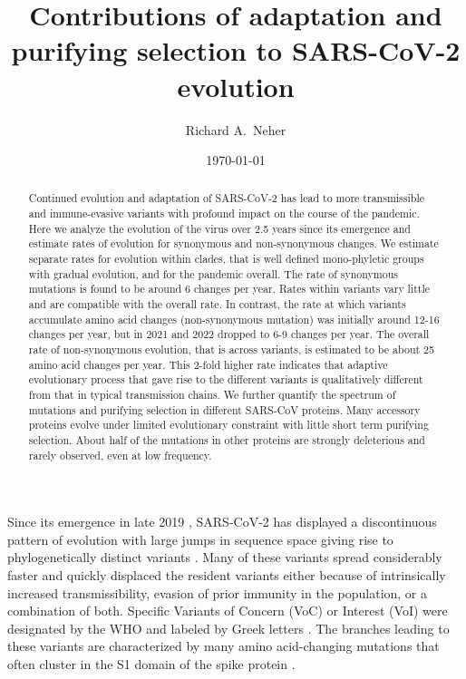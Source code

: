 \documentclass[aps,rmp, twocolumn]{revtex4}
\begin{document}
\title{Contributions of adaptation and purifying selection to SARS-CoV-2 evolution}
\author{Richard A.~Neher}
\address{Biozentrum, University of Basel, Basel, Switzerland }
\address{Swiss Institute of Bioinformatics, Switzerland }

\date{\today}

\begin{abstract}
Continued evolution and adaptation of SARS-CoV-2 has lead to more transmissible and immune-evasive variants with profound impact on the course of the pandemic.
Here we analyze the evolution of the virus over 2.5 years since its emergence and estimate rates of evolution for synonymous and non-synonymous changes.
We estimate separate rates for evolution within clades, that is well defined mono-phyletic groups with gradual evolution, and for the pandemic overall.
The rate of synonymous mutations is found to be around 6 changes per year.
Rates within variants vary little and are compatible with the overall rate.
In contrast, the rate at which variants accumulate amino acid changes (non-synonymous mutation) was initially around 12-16 changes per year, but in 2021 and 2022 dropped to 6-9 changes per year.
The overall rate of non-synonymous evolution, that is across variants, is estimated to be about 25 amino acid changes per year.
This 2-fold higher rate indicates that adaptive evolutionary process that gave rise to the different variants is qualitatively different from that in typical transmission chains.
We further quantify the spectrum of mutations and purifying selection in different SARS-CoV proteins.
Many accessory proteins evolve under limited evolutionary constraint with little short term purifying selection.
About half of the mutations in other proteins are strongly deleterious and rarely observed, even at low frequency.
\end{abstract}

\maketitle

Since its emergence in late 2019 \citep{zhu_novel_2020}, SARS-CoV-2 has displayed a discontinuous pattern of evolution with large jumps in sequence space giving rise to phylogenetically distinct variants \citep{hodcroft_spread_2021,volz_assessing_2021,tegally_detection_2021,faria_genomics_2021,naveca_covid-19_2021,viana_rapid_2022}.
Many of these variants spread considerably faster and quickly displaced the resident variants either because of intrinsically increased transmissibility, evasion of prior immunity in the population, or a combination of both.
Specific Variants of Concern (VoC) or Interest (VoI) were designated by the WHO and labeled by Greek letters \citep{konings_sars-cov-2_2021}.
The branches leading to these variants are characterized by many amino acid-changing mutations that often cluster in the S1 domain of the spike protein \citep{kistler_rapid_2022}.
\end{document}
